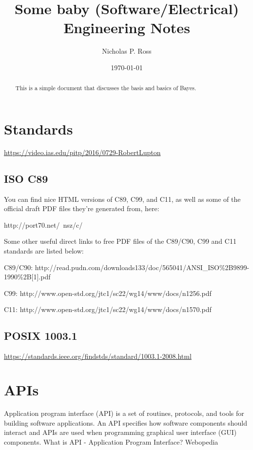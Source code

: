 \documentclass[11pt]{article}
\begin{document}
\title{Some baby (Software/Electrical) Engineering Notes}
\author{Nicholas P. Ross}
\date{\today}
\maketitle


\begin{abstract}
This is a simple document that discusses the basis and basics of Bayes. 
\end{abstract}


\tableofcontents


\newpage
\section{Standards}
\href{https://video.ias.edu/pitp/2016/0729-RobertLupton}{https://video.ias.edu/pitp/2016/0729-RobertLupton}

\subsection{ISO C89}
You can find nice HTML versions of C89, C99, and C11, as well as some of the official draft PDF files they're generated from, here:

http://port70.net/~nsz/c/

Some other useful direct links to free PDF files of the C89/C90, C99 and C11 standards are listed below:

C89/C90: http://read.pudn.com/downloads133/doc/565041/ANSI\_ISO\%2B9899-1990\%2B[1].pdf

C99: http://www.open-std.org/jtc1/sc22/wg14/www/docs/n1256.pdf

C11: http://www.open-std.org/jtc1/sc22/wg14/www/docs/n1570.pdf



\subsection{POSIX 1003.1}
\href{https://standards.ieee.org/findstds/standard/1003.1-2008.html}{https://standards.ieee.org/findstds/standard/1003.1-2008.html}




\newpage
\section{APIs}

Application program interface (API) is a set of routines, protocols, and tools for building software applications. An API specifies how software components should interact and APIs are used when programming graphical user interface (GUI) components.
What is API - Application Program Interface? Webopedia
\end{document}
